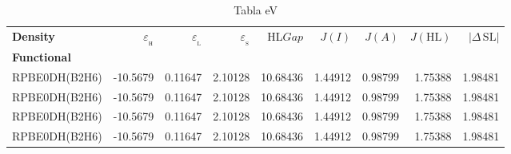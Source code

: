 \documentclass[preprint,landscape,12pt]{elsarticle}
\begin{document}
	\begin{table}
		\caption{ Tabla eV}
		\centering
		\footnotesize
		\begin{tabular}{lrrrrrrrr}
			\hline
			\textbf{Density}    & $\varepsilon_{_{\mathrm{H}}}$	& $\varepsilon_{_{\mathrm{L}}}$  & $\varepsilon_{_{\mathrm{S}}}$& HL$Gap$ & $J(I)$ & $J(A)$ & $J(\mathrm{HL})$  & \textbf{$\left|\Delta\,\mathrm{SL}\right|$}  \\
			\textbf{Functional} &   &  &     &   &  &  &  &  \\
			\hline \hline 

RPBE0DH(B2H6) & -10.5679 & 0.11647 & 2.10128 & 10.68436 & 1.44912 & 0.98799 & 1.75388 & 1.98481\\
RPBE0DH(B2H6) & -10.5679 & 0.11647 & 2.10128 & 10.68436 & 1.44912 & 0.98799 & 1.75388 & 1.98481\\
RPBE0DH(B2H6) & -10.5679 & 0.11647 & 2.10128 & 10.68436 & 1.44912 & 0.98799 & 1.75388 & 1.98481\\
RPBE0DH(B2H6) & -10.5679 & 0.11647 & 2.10128 & 10.68436 & 1.44912 & 0.98799 & 1.75388 & 1.98481\\

	 		\hline
		\end{tabular}
			\label{tab:eV}
	\end{table}
\end{document}

